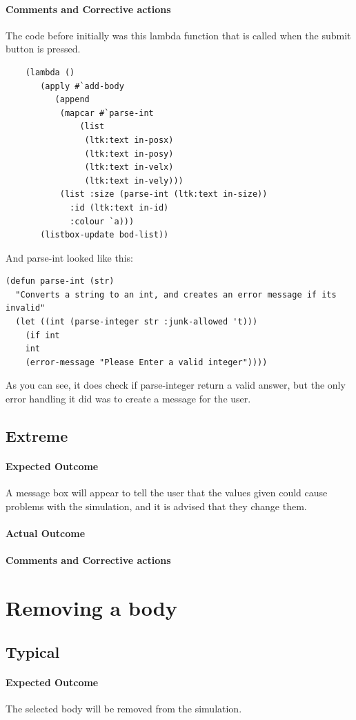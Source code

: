 \paragraph{Comments and Corrective actions}
The code before initially was this lambda function that is called when the
submit button is pressed. 
\begin{lstlisting}
	(lambda ()
	   (apply #`add-body
		  (append
		   (mapcar #`parse-int
			   (list
			    (ltk:text in-posx)
			    (ltk:text in-posy)
			    (ltk:text in-velx)
			    (ltk:text in-vely)))
		   (list :size (parse-int (ltk:text in-size))
			 :id (ltk:text in-id)
			 :colour `a)))
	   (listbox-update bod-list))
\end{lstlisting}
And parse-int looked like this:
\begin{lstlisting}
(defun parse-int (str)
  "Converts a string to an int, and creates an error message if its invalid"
  (let ((int (parse-integer str :junk-allowed 't)))
    (if int
	int
	(error-message "Please Enter a valid integer"))))
\end{lstlisting}
As you can see, it does check if parse-integer return a valid answer, but the
only error handling it did was to create a message for the user.
\subsection{Extreme}
\paragraph{Expected Outcome}
A message box will appear to tell the user that the values given could cause
problems with the simulation, and it is advised that they change them.
\paragraph{Actual Outcome}
\paragraph{Comments and Corrective actions}


\section{Removing a body}
\subsection{Typical}
\paragraph{Expected Outcome}
The selected body will be removed from the simulation.
